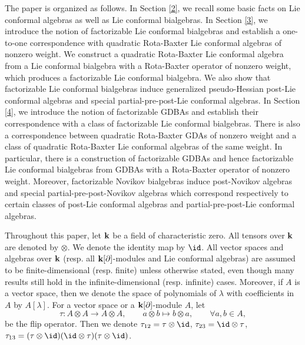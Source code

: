 \documentclass[12pt]{amsart}
\begin{document}
 


 


    The paper is organized as follows. In Section \ref{2}, we recall some basic facts on Lie conformal algebras as well as Lie conformal bialgebras.
    In Section \ref{3}, we introduce the notion of factorizable Lie conformal bialgebras and establish a one-to-one correspondence with quadratic Rota-Baxter Lie conformal algebras of nonzero weight.
    We construct a quadratic Rota-Baxter Lie conformal algebra from a Lie conformal bialgebra with a Rota-Baxter operator of nonzero weight, which produces a factorizable Lie conformal bialgebra.
    We also show that factorizable Lie conformal bialgebras induce generalized pseudo-Hessian post-Lie conformal algebras and special partial-pre-post-Lie conformal algebras.
    In Section \ref{4},  we  introduce the notion of factorizable GDBAs and establish their correspondence with a  class of factorizable Lie conformal bialgebras.
    There is also a correspondence between quadratic  Rota-Baxter GDAs of nonzero weight and a class of quadratic Rota-Baxter Lie conformal algebras of the same weight.
In particular, there is a construction of factorizable GDBAs and
hence factorizable Lie conformal bialgebras from GDBAs with a
Rota-Baxter operator of nonzero weight. Moreover, factorizable
Novikov bialgebras induce post-Novikov algebras and special
partial-pre-post-Novikov algebras which correspond respectively to
certain classes of post-Lie conformal algebras and
partial-pre-post-Lie conformal algebras.
 

    Throughout this paper, let  $\bf k$ be a field of characteristic zero. All tensors over ${\bf k}$ are denoted by $\otimes$. We denote the identity map by $\id$. All vector spaces and algebras over ${\bf k}$ (resp. all ${\bf k}[\partial]$-modules and Lie conformal algebras) are assumed to be finite-dimensional (resp. finite) unless otherwise stated, even though many results still hold in the infinite-dimensional (resp. infinite) cases. Moreover, if $A$ is a vector space, then we denote the space of polynomials of $\lambda$ with coefficients in $A$ by $A[\lambda]$. For a vector space or a ${\bf k}[\partial]$-module $A$, let
    \begin{equation*}
        \tau:A\otimes A\rightarrow A\otimes A,\qquad a\otimes b\mapsto b\otimes a,\qquad \forall a,b\in A,
    \end{equation*}
    be the flip operator. Then we denote $\tau_{12} = \tau \otimes \id$, $ \tau_{23} = \id \otimes \tau$, $\tau_{13} = (\tau\otimes \id)(\id \otimes \tau)(\tau \otimes \id)$.
\end{document}
